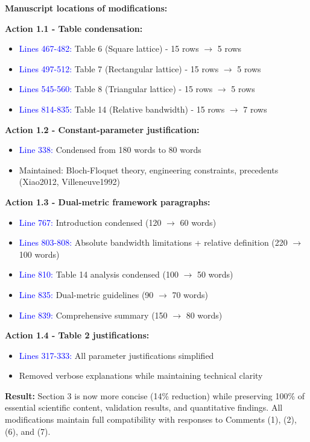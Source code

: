 \documentclass[11pt,a4paper]{article}
\newenvironment{changesbox}{%
    \par\medskip\noindent{\color{changescolor}\rule{\linewidth}{2pt}}\par
    \noindent{\color{changescolor}\bfseries Manuscript Changes}\par\smallskip
}{%
    \par\noindent{\color{changescolor}\rule{\linewidth}{0.5pt}}\medskip
}
\begin{document}
\begin{changesbox}
\textbf{Manuscript locations of modifications:}

\textbf{Action 1.1 - Table condensation:}
\begin{itemize}
    \item \textcolor{blue}{Lines 467-482:} Table 6 (Square lattice) - 15 rows $\rightarrow$ 5 rows
    \item \textcolor{blue}{Lines 497-512:} Table 7 (Rectangular lattice) - 15 rows $\rightarrow$ 5 rows
    \item \textcolor{blue}{Lines 545-560:} Table 8 (Triangular lattice) - 15 rows $\rightarrow$ 5 rows
    \item \textcolor{blue}{Lines 814-835:} Table 14 (Relative bandwidth) - 15 rows $\rightarrow$ 7 rows
\end{itemize}

\textbf{Action 1.2 - Constant-parameter justification:}
\begin{itemize}
    \item \textcolor{blue}{Line 338:} Condensed from 180 words to 80 words
    \item Maintained: Bloch-Floquet theory, engineering constraints, precedents (Xiao2012, Villeneuve1992)
\end{itemize}

\textbf{Action 1.3 - Dual-metric framework paragraphs:}
\begin{itemize}
    \item \textcolor{blue}{Line 767:} Introduction condensed (120 $\rightarrow$ 60 words)
    \item \textcolor{blue}{Lines 803-808:} Absolute bandwidth limitations + relative definition (220 $\rightarrow$ 100 words)
    \item \textcolor{blue}{Line 810:} Table 14 analysis condensed (100 $\rightarrow$ 50 words)
    \item \textcolor{blue}{Line 835:} Dual-metric guidelines (90 $\rightarrow$ 70 words)
    \item \textcolor{blue}{Line 839:} Comprehensive summary (150 $\rightarrow$ 80 words)
\end{itemize}

\textbf{Action 1.4 - Table 2 justifications:}
\begin{itemize}
    \item \textcolor{blue}{Lines 317-333:} All parameter justifications simplified
    \item Removed verbose explanations while maintaining technical clarity
\end{itemize}

\textbf{Result:} Section 3 is now more concise (14\% reduction) while preserving 100\% of essential scientific content, validation results, and quantitative findings. All modifications maintain full compatibility with responses to Comments (1), (2), (6), and (7).
\end{changesbox}
\end{document}
